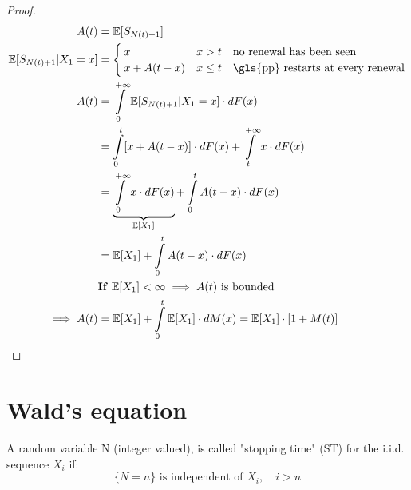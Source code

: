 \begin{proof}
	\begin{equation}\begin{split}
		A(t) &= \exp[S_{N(t)+1}]\\
		\exp[S_{N(t)+1}|X_1=x] &=
		\begin{cases}
			x & x>t \quad \text{no renewal has been seen} \\
			x + A(t-x) & x \le t \quad \text{\gls{pp} restarts at every renewal}
		\end{cases} \\
		A(t) &= \int\limits_0^{+\infty} \exp[S_{N(t)+1}|X_1 = x] \cdot dF(x) \\
		&= \int\limits_0^{t} [x+ A(t-x)] \cdot dF(x) + \int\limits_t^{+\infty} x \cdot dF(x) \\
		&= \underbrace{\int\limits_0^{+\infty} x \cdot dF(x)}_{\exp[X_1]} + \int\limits_0^{t} A(t-x) \cdot dF(x) \\
		&= \exp[X_1] + \int\limits_0^{t} A(t-x) \cdot dF(x)\\
		& \text{\textbf{If} }\exp[X_1] < \infty \implies A(t) \text{ is bounded} \\
		\implies A(t) &= \exp[X_1] + \int\limits_0^{t} \exp[X_1] \cdot dM(x) = \exp[X_1]\cdot [1+M(t)]\\
	\end{split}\end{equation}
\end{proof}

\section{Wald's equation}
\begin{definition}
A random variable N (integer valued), is called "stopping time" (ST) for the i.i.d. sequence $X_i$ if:
\begin{equation}
	\{N=n\} \text{ is independent of }X_i ,\quad i > n
\end{equation}
\end{definition}

